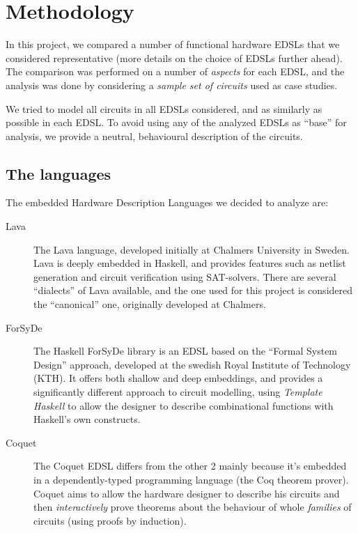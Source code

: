 \documentclass[a4paper]{article}
\begin{document}
    \section{Methodology}
    \label{sec:methods}
        In this project, we compared a number of functional hardware EDSLs that we considered
        representative (more details on the choice of EDSLs further ahead). The comparison was
        performed on a number of \emph{aspects} for each EDSL, and the analysis was done by
        considering a \emph{sample set of circuits} used as case studies.

        We tried to model all circuits in all EDSLs considered, and as similarly as possible in each
        EDSL. To avoid using any of the analyzed EDSLs as ``base'' for analysis, we provide a
        neutral, behavioural description of the circuits.

        \subsection{The languages}
        \label{subsec:languages}
            The embedded Hardware Description Languages we decided to analyze are:

            \begin{description}
                \item[Lava] The Lava\cite{lava1998} language, developed initially at Chalmers
                    University in Sweden.  Lava is deeply embedded in Haskell, and provides features
                    such as netlist generation and circuit verification using SAT-solvers. There are
                    several ``dialects'' of Lava available, and the one used for this project is
                    considered the ``canonical'' one, originally developed at Chalmers.

                \item[ForSyDe] The Haskell ForSyDe library is an EDSL based on the ``Formal System
                    Design'' approach\cite{forsyde1999}, developed at the swedish Royal Institute of
                    Technology (KTH).  It offers both shallow and deep embeddings, and provides a
                    significantly different approach to circuit modelling, using \emph{Template
                        Haskell} to allow the designer to describe combinational functions with
                    Haskell's own constructs.

                \item[Coquet] The Coquet\cite{coquet2011} EDSL differs from the other 2 mainly
                    because it's embedded in a dependently-typed programming language (the Coq theorem
                    prover). Coquet aims to allow the hardware designer to describe his circuits and
                    then \emph{interactively} prove theorems about the behaviour of whole
                    \emph{families} of circuits (using proofs by induction).
            \end{description}
\end{document}
